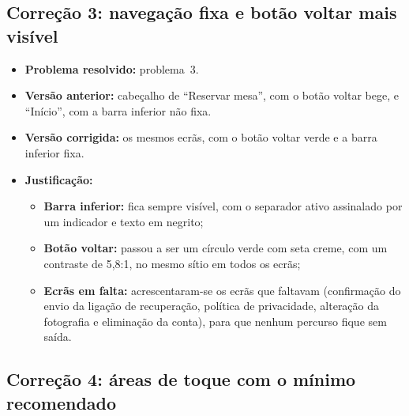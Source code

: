 
\subsection{Correção 3: navegação fixa e botão voltar mais visível}

\begin{itemize}
  \item \textbf{Problema resolvido:} problema~3.
  \item \textbf{Versão anterior:} cabeçalho de ``Reservar mesa'', com o botão voltar bege, e
        ``Início'', com a barra inferior não fixa.
  \item \textbf{Versão corrigida:} os mesmos ecrãs, com o botão voltar verde e a barra inferior
        fixa.
  \item \textbf{Justificação:}
    \begin{itemize}
      \item \textbf{Barra inferior:} fica sempre visível, com o separador ativo assinalado por um
            indicador e texto em negrito;
      \item \textbf{Botão voltar:} passou a ser um círculo verde com seta creme, com um contraste
            de 5,8:1, no mesmo sítio em todos os ecrãs;
      \item \textbf{Ecrãs em falta:} acrescentaram-se os ecrãs que faltavam (confirmação do envio
            da ligação de recuperação, política de privacidade, alteração da fotografia e
            eliminação da conta), para que nenhum percurso fique sem saída.
    \end{itemize}
\end{itemize}


\subsection{Correção 4: áreas de toque com o mínimo recomendado}

